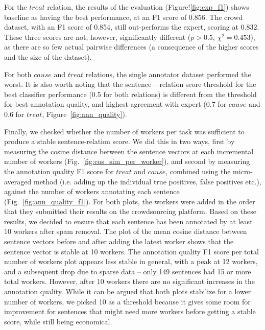 For the $treat$ relation, the results of the evaluation (Figure!\ref{fig:exp_f1}) shows baseline as having the best performance, at an F1 score of 0.856. The crowd dataset, with an F1 score of 0.854, still out-performs the expert, scoring at 0.832.  These three scores are not, however, significantly different ($p > 0.5$, $ \chi^2 = 0.453 $), as there are so few actual pairwise differences (a consequence of the higher scores and the size of the dataset). 

For both $cause$ and $treat$ relations, the single annotator dataset performed the worst. It is also worth noting that the sentence -- relation score threshold for the best classifier performance (0.5 for both relations) is different from the threshold for best annotation quality, and highest agreement with expert (0.7 for $cause$ and 0.6 for $treat$, Figure~\ref{fig:ann_quality}).

Finally, we checked whether the number of workers per task was sufficient to produce a stable sentence-relation score. We did this in two ways, first by measuring the cosine distance between the sentence vectors at each incremental number of workers (Fig.~\ref{fig:cos_sim_per_worker}), and second by measuring the annotation quality F1 score for $treat$ and $cause$, combined using the micro-averaged method (i.e. adding up the individual true positives, false positives etc.), against the number of workers annotating each sentence (Fig.~\ref{fig:ann_quality_f1}). For both plots, the workers were added in the order that they submitted their results on the crowdsourcing platform.  Based on these results, we decided to ensure that each sentence has been annotated by at least 10 workers after spam removal.  The plot of the mean cosine distance between sentence vectors before and after adding the latest worker shows that the sentence vector is stable at 10 workers. The annotation quality F1 score per total number of workers plot appears less stable in general, with a peak at 12 workers, and a subsequent drop due to sparse data -- only 149 sentences had 15 or more total workers. However, after 10 workers there are no significant increases in the annotation quality.  While it can be argued that both plots stabilize for a lower number of workers, we picked 10 as a threshold because it gives some room for improvement for sentences that might need more workers before getting a stable score, while still being economical.

